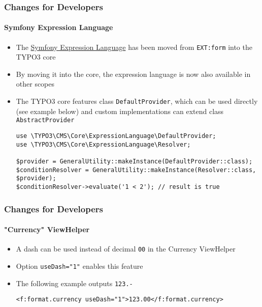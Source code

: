 \begin{frame}[fragile]
	\frametitle{Changes for Developers}
	\framesubtitle{Symfony Expression Language}

	\lstset{basicstyle=\tiny\ttfamily}

	\begin{itemize}
		\item The \href{https://symfony.com/doc/current/components/expression_language/syntax.html}{Symfony Expression Language}
			has been moved from \texttt{EXT:form} into the TYPO3 core
		\item By moving it into the core, the expression language is now also
			available in other scopes
		\item The TYPO3 core features class \texttt{DefaultProvider}, which can be used
			directly (see example below) and custom implementations can extend
			class \texttt{AbstractProvider}

			\begin{lstlisting}
use \TYPO3\CMS\Core\ExpressionLanguage\DefaultProvider;
use \TYPO3\CMS\Core\ExpressionLanguage\Resolver;

$provider = GeneralUtility::makeInstance(DefaultProvider::class);
$conditionResolver = GeneralUtility::makeInstance(Resolver::class, $provider);
$conditionResolver->evaluate('1 < 2'); // result is true
			\end{lstlisting}

	\end{itemize}

\end{frame}


\begin{frame}[fragile]
	\frametitle{Changes for Developers}
	\framesubtitle{"Currency" ViewHelper}


	\begin{itemize}
		\item A dash can be used instead of decimal \texttt{00} in the
			Currency ViewHelper
		\item Option \texttt{useDash="1"} enables this feature
		\item The following example outputs \texttt{123.-}

			\begin{lstlisting}
<f:format.currency useDash="1">123.00</f:format.currency>
			\end{lstlisting}

	\end{itemize}

\end{frame}

